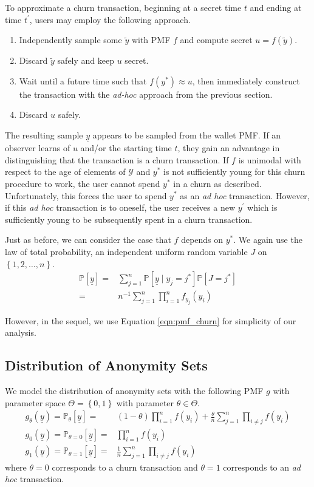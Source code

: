 \documentclass{tran-l}
\theoremstyle{cor}
\theoremstyle{definition}
\theoremstyle{remark}
\theoremstyle{conjecture}
\numberwithin{equation}{section}
\begin{document}
To approximate a churn transaction, beginning at a secret time $t$ and ending at time $t^\prime$, users may employ the following approach.
\begin{enumerate}
\item Independently sample some $\tilde{y}$ with PMF $f$ and compute secret $u = f(\tilde{y})$.
\item Discard $\tilde{y}$ safely and keep $u$ secret.
\item Wait until a future time such that $f(y^*) \approx u$, then immediately construct the transaction with the \textit{ad-hoc} approach from the previous section.
\item Discard $u$ safely.
\end{enumerate}
The resulting sample $\underline{y}$ appears to be sampled from the wallet PMF.
If an observer learns of $u$ and/or the starting time $t$, they gain an advantage in distinguishing that the transaction is a churn transaction.
If $f$ is unimodal with respect to the age of elements of $\mathcal{Y}$ and $y^*$ is not sufficiently young for this churn procedure to work, the user cannot spend $y^*$ in a churn as described.
Unfortunately, this forces the user to spend $y^*$ as an \textit{ad hoc} transaction.
However, if this \textit{ad hoc} transaction is to oneself, the user receives a new $y^\prime$ which is sufficiently young to be subsequently spent in a churn transaction.

Just as before, we can consider the case that $f$ depends on $y^*$.
We again use the law of total probability, an independent uniform random variable $J$ on $\left\{1, 2, \ldots, n\right\}$.
\begin{align}
\mathbb{P}[\underline{y}] =& \sum_{j=1}^{n} \mathbb{P}[\underline{y} \mid y_j = j^*] \mathbb{P}[J=j^*] \\
=& n^{-1}\sum_{j=1}^n \prod_{i=1}^n f_{y_j}(y_i)
\end{align}

However, in the sequel, we use Equation \ref{eqn:pmf_churn} for simplicity of our analysis.


\subsection{Distribution of Anonymity Sets}\label{sec:basic_test_distribution}

We model the distribution of anonymity sets with the following PMF $g$ with parameter space $\Theta = \left\{0,1\right\}$ with parameter $\theta \in \Theta$.
\begin{align}
\label{eqn:main} g_\theta(\underline{y}) = \mathbb{P}_\theta[\underline{y}] =& (1-\theta)\prod_{i =1}^n f(y_i) + \frac{\theta}{n} \sum_{j=1}^{n} \prod_{i \neq j} f(y_i)\\
g_0(\underline{y}) = \mathbb{P}_{\theta=0}[\underline{y}]  =&  \prod_{i =1}^n f(y_i) \\
g_1(\underline{y}) = \mathbb{P}_{\theta=1}[\underline{y}] =& \frac{1}{n} \sum_{j=1}^{n} \prod_{i \neq j} f(y_i)
\end{align} where $\theta = 0$ corresponds to a churn transaction and $\theta = 1$ corresponds to an \textit{ad hoc} transaction.
\end{document}
